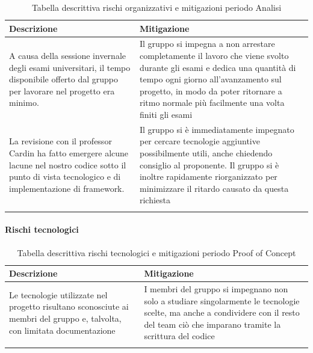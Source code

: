 \begin{center}


    \begin{xltabular}{\textwidth}{| X | X |}
                
        \textbf{\color{white} Descrizione} & \textbf{\color{white} Mitigazione}\\ 
        \endhead
    
        A causa della sessione invernale degli esami universitari, il tempo disponibile offerto dal gruppo per lavorare nel progetto era minimo. &
        Il gruppo si impegna a non arrestare completamente il lavoro che viene svolto durante gli esami e dedica una quantità di tempo ogni giorno
        all'avanzamento sul progetto, in modo da poter ritornare a ritmo normale più facilmente una volta finiti gli esami \\
        \hline

        La revisione con il professor Cardin ha fatto emergere alcune lacune nel nostro codice sotto il punto di vista tecnologico e di implementazione di framework. &
        Il gruppo si è immediatamente impegnato per cercare tecnologie aggiuntive possibilmente utili, anche chiedendo consiglio al proponente. Il gruppo si è inoltre
        rapidamente riorganizzato per minimizzare il ritardo causato da questa richiesta \\
        \hline
            
        \caption{Tabella descrittiva rischi organizzativi e mitigazioni periodo Analisi}\label{tab:rischi_organizzativi_poc}
    \end{xltabular}
\end{center}

\paragraph{Rischi tecnologici}

\begin{center}
    \begin{xltabular}{\textwidth}{| X | X |}
                
        \textbf{\color{white} Descrizione} & \textbf{\color{white} Mitigazione}\\ 
        \endhead
    
        Le tecnologie utilizzate nel progetto risultano sconosciute ai membri del gruppo e, talvolta, con limitata documentazione &
        I membri del gruppo si impegnano non solo a studiare singolarmente le tecnologie scelte, ma anche a condividere con il resto del team ciò che imparano
        tramite la scrittura del codice \\
        \hline
            
        \caption{Tabella descrittiva rischi tecnologici e mitigazioni periodo Proof of Concept}\label{tab:rischi_tecnologici_poc}
    \end{xltabular}
\end{center}

